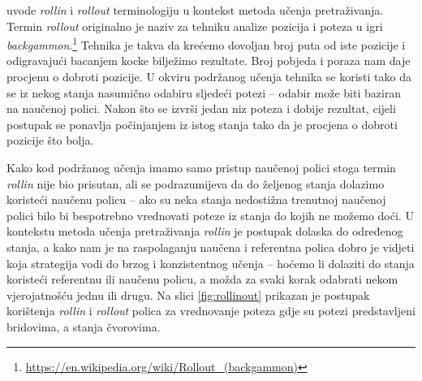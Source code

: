 \citet*{daume15lols} uvode \textit{rollin} i \textit{rollout} terminologiju u
kontekst metoda učenja pretraživanja. Termin \textit{rollout} originalno je
naziv za tehniku analize pozicija i poteza u igri
\textit{backgammon}.\footnote{\url{https://en.wikipedia.org/wiki/Rollout_(backgammon)}}
Tehnika je takva da krećemo dovoljan broj puta od iste pozicije i odigravajući
bacanjem kocke bilježimo rezultate. Broj pobjeda i poraza nam daje procjenu o
dobroti pozicije. U okviru podržanog učenja tehnika se koristi tako da se iz
nekog stanja nasumično odabiru sljedeći potezi -- odabir može biti baziran na
naučenoj polici. Nakon što se izvrši jedan niz poteza i dobije rezultat, cijeli
postupak se ponavlja počinjanjem iz istog stanja tako da je procjena o dobroti
pozicije što bolja.

Kako kod podržanog učenja imamo samo pristup naučenoj polici stoga termin
\textit{rollin} nije bio prisutan, ali se podrazumijeva da do željenog stanja
dolazimo koristeći naučenu policu -- ako su neka stanja nedostižna trenutnoj
naučenoj polici bilo bi bespotrebno vrednovati poteze iz stanja do kojih ne
možemo doći. U kontekstu metoda učenja pretraživanja \textit{rollin} je postupak
dolaska do određenog stanja, a kako nam je na raspolaganju naučena i referentna
polica dobro je vidjeti koja strategija vodi do brzog i konzistentnog učenja --
hoćemo li dolaziti do stanja koristeći referentnu ili naučenu policu, a možda za
svaki korak odabrati nekom vjerojatnošću jednu ili drugu. Na slici
\ref{fig:rollinout} prikazan je postupak korištenja \textit{rollin} i
\textit{rollout} polica za vrednovanje poteza gdje su potezi predstavljeni
bridovima, a stanja čvorovima.

